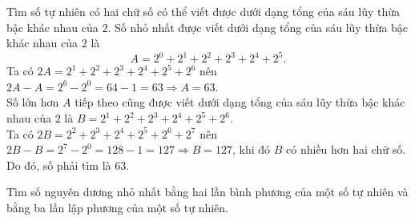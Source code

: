 \begin{bt}
Tìm số tự nhiên có hai chữ số có thể viết được dưới dạng tổng của sáu lũy thừa bậc khác nhau của $2$.
\loigiai
{
Số nhỏ nhất được viết dưới dạng tổng của sáu lũy thừa bậc khác nhau của $2$ là
$$A= 2^0+2^1+2^2+2^3+2^4+2^5.$$
Ta có $2A= 2^1+2^2+2^3+2^4+2^5+2^6$ nên
$2A-A= 2^6-2^0=64-1=63\Rightarrow A=63$.\\
Số lớn hơn $A$ tiếp theo cũng được viết dưới dạng tổng của sáu lũy thừa bậc khác nhau của $2$ là
$B=2^1+2^2+2^3+2^4+2^5+2^6$.\\
Ta có $2B= 2^2+2^3+2^4+2^5+2^6+2^7$ nên
$2B-B= 2^7-2^0=128-1=127\Rightarrow B=127$, khi đó $B$ có nhiều hơn hai chữ số.\\
Do đó, số phải tìm là 63.
}
\end{bt}
\begin{bt}
Tìm số nguyên dương nhỏ nhất bằng hai lần bình phương của một số tự nhiên và bằng ba lần lập phương của một số tự nhiên.
\end{bt}
















